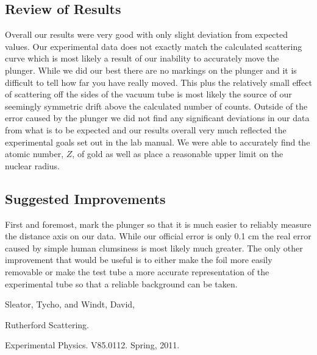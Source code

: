 \subsection{Review of Results}
\indent \indent Overall our results were very good with only slight deviation from expected values.  Our experimental data does not exactly match the calculated scattering curve which is most likely a result of our inability to accurately move the plunger.  While we did our best there are no markings on the plunger and it is difficult to tell how far you have really moved.  This plus the relatively small effect of scattering off the sides of the vacuum tube is most likely the source of our seemingly symmetric drift above the calculated number of counts.
\indent \indent  Outside of the error caused by the plunger we did not find any significant deviations in our data from what is to be expected and our results overall very much reflected the experimental goals set out in the lab manual.  We were able to accurately find the atomic number, $Z$, of gold as well as place a reasonable upper limit on the nuclear radius. 

\subsection{Suggested Improvements}
\indent \indent First and foremost, mark the plunger so that it is much easier to reliably measure the distance axis on our data.  While our official error is only 0.1 cm the real error caused by simple human clumsiness is most likely much greater.  The only other improvement that would be useful is to either make the foil more easily removable or make the test tube a more accurate representation of the experimental tube so that a reliable background can be taken. 

\begin{thebibliography}{99}
Sleator, Tycho, and Windt, David, \begin{em}Rutherford Scattering. \end{em}Experimental Physics. V85.0112. Spring, 2011.
\end{thebibliography}


